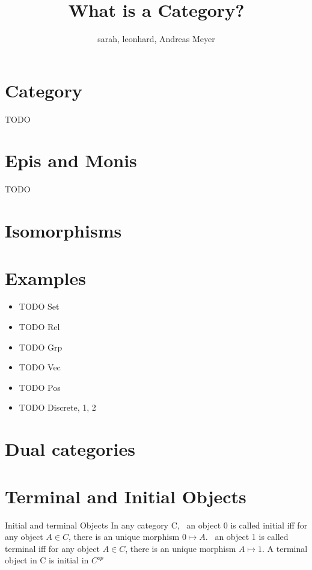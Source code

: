 
\def\pathToRoot{../}



\title{What is a Category?}
\author{sarah, leonhard, Andreas Meyer}
\maketitle

\section {Category}

TODO

\section {Epis and Monis}

TODO

\section {Isomorphisms}

\section {Examples}
 \begin {itemize}
  \item TODO Set%
  \item TODO Rel%
  \item TODO Grp%
  \item TODO Vec%
  \item TODO Pos%
  \item TODO Discrete, 1, 2%
 \end {itemize}

\section {Dual categories}

\section {Terminal and Initial Objects}
\begin {definition}{Initial and terminal Objects}
  In any category C,
  \ an object 0 is called initial iff for any object $A \in C$, there is an unique morphism $0 \mapsto A$.
  \ an object 1 is called terminal iff for any object $A \in C$, there is an unique morphism $A \mapsto 1$. A terminal object in C is initial in $C^{op}$

\end {definition}

